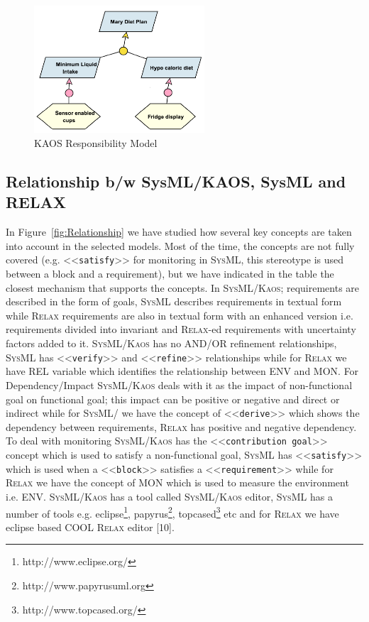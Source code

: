 \documentclass[10pt, conference, compsocconf]{IEEEtran}
\def\myrelax{\textsc{Relax}}                  %
\def\sysml{\textsc{SysML}}
\def\kaos{\textsc{Kaos}}
\newcommand{\Myfig}[1]{Figure~\ref{fig:#1}}
\newcommand{\stereotype}[1]{\textless\textless\texttt{#1}\textgreater\textgreater}
\begin{document}
\begin{figure}[!t]
\centering
\includegraphics[width=2.5in]{fig12}
\caption{KAOS Responsibility Model}
\label{fig:KAOSModel}
\end{figure}

\subsection{Relationship b/w SysML/KAOS, SysML and RELAX}

In \Myfig{Relationship} we have studied how several key concepts are taken into account in the selected models. Most of the time, the concepts are not fully covered (e.g. \stereotype{satisfy} for monitoring in \sysml{}, this stereotype is used between a block and a requirement), but we have indicated in the table the closest mechanism that supports the concepts. In \sysml{}/\kaos{}; requirements are described in the form of goals, \sysml{} describes requirements in textual form while \myrelax{} requirements are also in textual form with an enhanced version i.e. requirements divided into invariant and \myrelax{}-ed requirements with uncertainty factors added to it. \sysml{}/\kaos{} has no AND/OR refinement relationships, \sysml{} has \stereotype{verify} and \stereotype{refine} relationships while for \myrelax{} we have REL variable which identifies the relationship between ENV and MON. For Dependency/Impact \sysml{}/\kaos{} deals with it as the impact of non-functional goal on functional goal; this impact can be positive or negative and direct or indirect while for \sysml{}/ we have the concept of \stereotype{derive} which shows the dependency between requirements, \myrelax{} has positive and negative dependency. To deal with monitoring \sysml{}/\kaos{} has the \stereotype{contribution goal} concept which is used to satisfy a non-functional goal, \sysml{} has \stereotype{satisfy} which is  used when a \stereotype{block} satisfies a \stereotype{requirement} while for \myrelax{} we have the concept of MON which is used to measure the environment i.e. ENV. \sysml{}/\kaos{} has a tool called \sysml{}/\kaos{} editor, \sysml{} has a number of tools e.g. eclipse\footnote{http://www.eclipse.org/}, papyrus\footnote{http://www.papyrusuml.org}, topcased\footnote{http://www.topcased.org/} etc and for \myrelax{} we have eclipse based COOL \myrelax{} editor [10]. 
\end{document}
